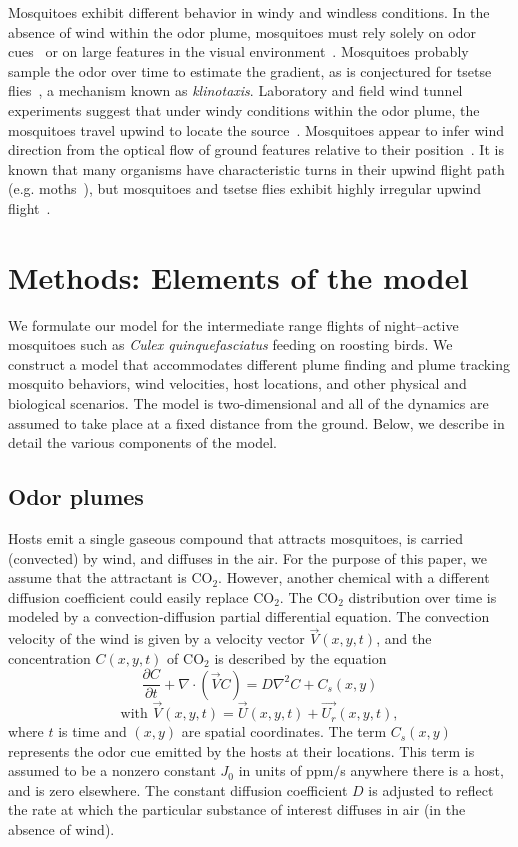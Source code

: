 \documentclass[10pt]{article}
\begin{document}
Mosquitoes exhibit different behavior in windy and windless conditions. In the absence of wind within the odor plume, mosquitoes must rely solely on odor cues~\cite{Vickers2000} or on large features in the visual environment~\cite{Bidlingmayer1994}. Mosquitoes probably sample the odor over time to estimate the gradient, as is conjectured for tsetse flies~\cite{Carde1996}, a mechanism known as \textit{klinotaxis}.
%
Laboratory and field wind tunnel experiments suggest that under windy conditions within the odor plume, the mosquitoes travel upwind to locate the source~\cite{Cooperband2006, Dekker2005,Dekker2001}. Mosquitoes appear to infer wind direction from the optical flow of ground features relative to their position~\cite{Carde1996}.
It is known that many organisms have characteristic turns in their upwind flight path (e.g. moths~\cite{Carde1996,Vickers2000}), but mosquitoes and tsetse flies exhibit highly irregular upwind flight~\cite{Davis1996}.

\section*{Methods: Elements of the model}

We formulate our model for the intermediate range flights of night--active mosquitoes such as \textsl{Culex quinquefasciatus} feeding on roosting birds.   We construct a model that accommodates different plume finding and plume tracking mosquito behaviors, wind velocities, host locations, and other physical and biological scenarios.  The model is two-dimensional and all of the dynamics are assumed to take place at a fixed distance from the ground.
Below, we describe in detail the various components of the model.


\subsection*{Odor plumes}
Hosts emit a single gaseous compound that attracts mosquitoes, is carried (convected) by wind,
and diffuses in the air. For the purpose of this paper, we assume that the attractant is CO$_2$. However, another chemical with a different diffusion coefficient could easily replace CO$_2$.
The CO$_2$ distribution over time is modeled by a convection-diffusion partial differential equation.  The convection velocity of the wind is given by
a velocity vector ${\vec V}(x,y,t)$, and the concentration $C(x,y,t)$ of CO$_2$ is described by the  equation
\begin{equation}\label{eq:conv-diff}
\frac{\partial C}{\partial t} + \nabla\cdot ( {\vec V} C ) = D\nabla^2 C + C_s(x,y)
\end{equation}
\[
\mbox{with\ \ \  } \vec{V}(x,y,t) = \vec{U}(x,y,t) + \vec{U_r}(x,y,t),
\]
where $t$ is time and $(x,y)$ are spatial coordinates.  The term $C_s(x,y)$ represents the odor
cue emitted by the hosts at their locations. This term is 
assumed to be a nonzero constant $J_0$ in units of ppm$/$s anywhere there is a host, and is zero elsewhere.
The constant diffusion coefficient $D$ is adjusted to reflect the rate at which the particular substance of interest diffuses in air (in the absence of wind).
\end{document}
